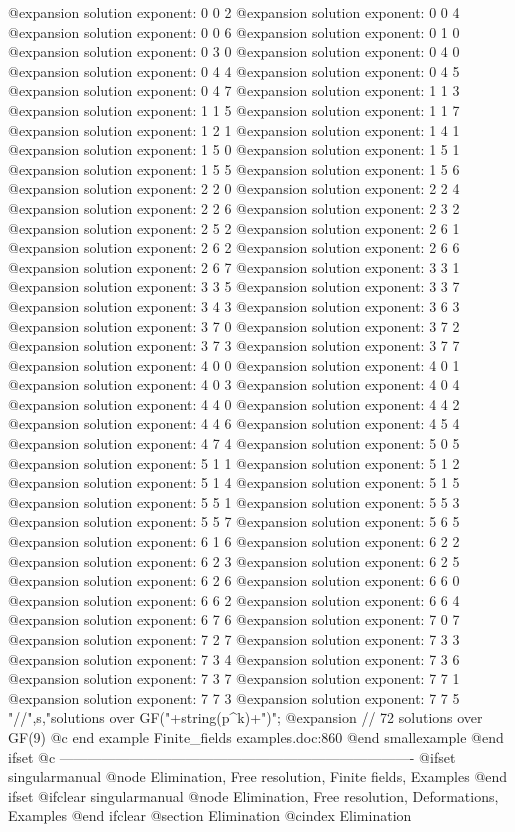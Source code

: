 @expansion{} solution exponent: 0 0 2
@expansion{} solution exponent: 0 0 4
@expansion{} solution exponent: 0 0 6
@expansion{} solution exponent: 0 1 0
@expansion{} solution exponent: 0 3 0
@expansion{} solution exponent: 0 4 0
@expansion{} solution exponent: 0 4 4
@expansion{} solution exponent: 0 4 5
@expansion{} solution exponent: 0 4 7
@expansion{} solution exponent: 1 1 3
@expansion{} solution exponent: 1 1 5
@expansion{} solution exponent: 1 1 7
@expansion{} solution exponent: 1 2 1
@expansion{} solution exponent: 1 4 1
@expansion{} solution exponent: 1 5 0
@expansion{} solution exponent: 1 5 1
@expansion{} solution exponent: 1 5 5
@expansion{} solution exponent: 1 5 6
@expansion{} solution exponent: 2 2 0
@expansion{} solution exponent: 2 2 4
@expansion{} solution exponent: 2 2 6
@expansion{} solution exponent: 2 3 2
@expansion{} solution exponent: 2 5 2
@expansion{} solution exponent: 2 6 1
@expansion{} solution exponent: 2 6 2
@expansion{} solution exponent: 2 6 6
@expansion{} solution exponent: 2 6 7
@expansion{} solution exponent: 3 3 1
@expansion{} solution exponent: 3 3 5
@expansion{} solution exponent: 3 3 7
@expansion{} solution exponent: 3 4 3
@expansion{} solution exponent: 3 6 3
@expansion{} solution exponent: 3 7 0
@expansion{} solution exponent: 3 7 2
@expansion{} solution exponent: 3 7 3
@expansion{} solution exponent: 3 7 7
@expansion{} solution exponent: 4 0 0
@expansion{} solution exponent: 4 0 1
@expansion{} solution exponent: 4 0 3
@expansion{} solution exponent: 4 0 4
@expansion{} solution exponent: 4 4 0
@expansion{} solution exponent: 4 4 2
@expansion{} solution exponent: 4 4 6
@expansion{} solution exponent: 4 5 4
@expansion{} solution exponent: 4 7 4
@expansion{} solution exponent: 5 0 5
@expansion{} solution exponent: 5 1 1
@expansion{} solution exponent: 5 1 2
@expansion{} solution exponent: 5 1 4
@expansion{} solution exponent: 5 1 5
@expansion{} solution exponent: 5 5 1
@expansion{} solution exponent: 5 5 3
@expansion{} solution exponent: 5 5 7
@expansion{} solution exponent: 5 6 5
@expansion{} solution exponent: 6 1 6
@expansion{} solution exponent: 6 2 2
@expansion{} solution exponent: 6 2 3
@expansion{} solution exponent: 6 2 5
@expansion{} solution exponent: 6 2 6
@expansion{} solution exponent: 6 6 0
@expansion{} solution exponent: 6 6 2
@expansion{} solution exponent: 6 6 4
@expansion{} solution exponent: 6 7 6
@expansion{} solution exponent: 7 0 7
@expansion{} solution exponent: 7 2 7
@expansion{} solution exponent: 7 3 3
@expansion{} solution exponent: 7 3 4
@expansion{} solution exponent: 7 3 6
@expansion{} solution exponent: 7 3 7
@expansion{} solution exponent: 7 7 1
@expansion{} solution exponent: 7 7 3
@expansion{} solution exponent: 7 7 5
  "//",s,"solutions over GF("+string(p^k)+")";
@expansion{} // 72 solutions over GF(9)
@c end example Finite_fields examples.doc:860
@end smallexample
@end ifset
@c ----------------------------------------------------------------------------
@ifset singularmanual
@node Elimination, Free resolution, Finite fields, Examples
@end ifset
@ifclear singularmanual
@node Elimination, Free resolution, Deformations, Examples
@end ifclear
@section Elimination
@cindex Elimination

